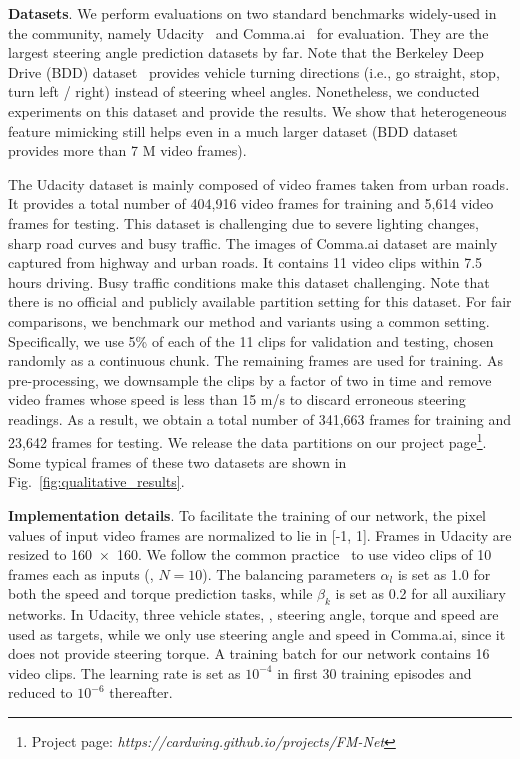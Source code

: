 

\noindent\textbf{Datasets}. We perform evaluations on two standard benchmarks widely-used in the community, namely Udacity~\cite{udacity} and Comma.ai~\cite{santana2016learning} for evaluation.
They are the largest steering angle prediction datasets by far. Note that the Berkeley Deep Drive (BDD) dataset~\cite{yu2018bdd100k} provides vehicle turning directions (i.e., go straight, stop, turn left / right) instead of steering wheel angles. Nonetheless, we conducted experiments on this dataset and provide the results. We show that heterogeneous feature mimicking still helps even in a much larger dataset (BDD dataset provides more than 7 M video frames).

The Udacity dataset is mainly composed of video frames taken from urban roads. It provides a total number of 404,916 video frames for training and 5,614 video frames for testing. This dataset is challenging due to severe lighting changes, sharp road curves and busy traffic.
The images of Comma.ai dataset are mainly captured from highway and urban roads. It contains 11 video clips within 7.5 hours driving. Busy traffic conditions make this dataset challenging.
Note that there is no official and publicly available partition setting for this dataset. For fair comparisons, we benchmark our method and variants using a common setting. Specifically, we use 5\% of each of the 11 clips for validation and testing, chosen randomly as a continuous chunk. The remaining frames are used for training. As pre-processing, we downsample the clips by a factor of two in time and remove video frames whose speed is less than 15 m/s to discard erroneous steering readings. As a result, we obtain a total number of 341,663 frames for training and 23,642 frames for testing. We release the data partitions on our project page\footnote{Project page: \emph{https://cardwing.github.io/projects/FM-Net}}.
Some typical frames of these two datasets are shown in Fig.~\ref{fig:qualitative_results}.



\vspace{0.1cm}
\noindent\textbf{Implementation details}. To facilitate the training of our network, the pixel values of input video frames are normalized to lie in [-1, 1]. Frames in Udacity are resized to 160~$\times$~160.
We follow the common practice~\cite{udacity} to use video clips of 10 frames each as inputs (\ie, $N=10$).
The balancing parameters $\alpha_l$ is set as 1.0 for both the speed and torque prediction tasks, while $\beta_k$ is set as 0.2 for all auxiliary networks.
In Udacity, three vehicle states, \ie, steering angle, torque and speed are used as targets, while we only use steering angle and speed in Comma.ai, since it does not provide steering torque.
A training batch for our network contains 16 video clips. The learning rate is set as $10^{-4}$ in first 30 training episodes and reduced to $10^{-6}$ thereafter.











